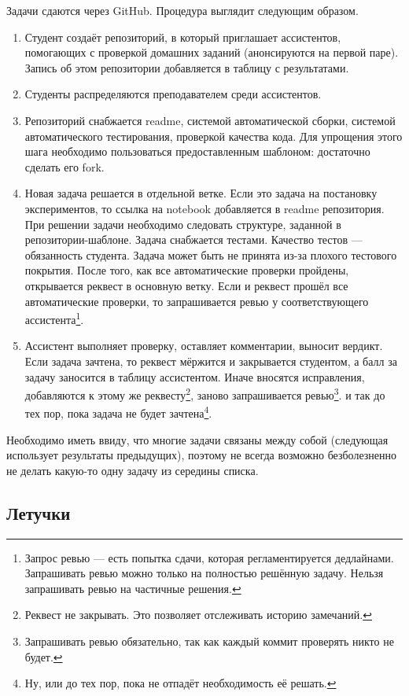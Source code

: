 Задачи сдаются через GitHub. Процедура выглядит следующим образом.
\begin{enumerate}
    \item Студент создаёт репозиторий, в который приглашает ассистентов, помогающих с проверкой домашних заданий (анонсируются на первой паре). Запись об этом репозитории добавляется в таблицу с результатами. 
    \item Студенты распределяются преподавателем среди ассистентов.
    \item Репозиторий снабжается readme, системой автоматической сборки, системой автоматического тестирования, проверкой качества кода. Для упрощения этого шага необходимо пользоваться предоставленным шаблоном: достаточно сделать его fork. 
    \item Новая задача решается в отдельной ветке. Если это задача на постановку экспериментов, то ссылка на notebook добавляется в readme репозитория. При решении задачи необходимо следовать структуре, заданной в репозитории-шаблоне. Задача снабжается тестами. Качество тестов --- обязанность студента. Задача может быть не принята из-за плохого тестового покрытия. После того, как все автоматические проверки пройдены, открывается реквест в основную ветку. Если и реквест прошёл все автоматические проверки, то запрашивается ревью у соответствующего ассистента\footnote{Запрос ревью --- есть попытка сдачи, которая регламентируется дедлайнами. Запрашивать ревью можно только на полностью решённую задачу. Нельзя запрашивать ревью на частичные решения.}. 
    \item Ассистент выполняет проверку, оставляет комментарии, выносит вердикт. Если задача зачтена, то реквест мёржится и закрывается студентом, а балл за задачу заносится в таблицу ассистентом. Иначе вносятся исправления, добавляются к этому же реквесту\footnote{Реквест не закрывать. Это позволяет отслеживать историю замечаний.}, заново запрашивается ревью\footnote{Запрашивать ревью обязательно, так как каждый коммит проверять никто не будет.}. и так до тех пор, пока задача не будет зачтена\footnote{Ну, или до тех пор, пока не отпадёт необходимость её решать.}.
\end{enumerate}

Необходимо иметь ввиду, что многие задачи связаны между собой (следующая использует результаты предыдущих), поэтому не всегда возможно безболезненно не делать какую-то одну задачу из середины списка.

\subsection{Летучки}

